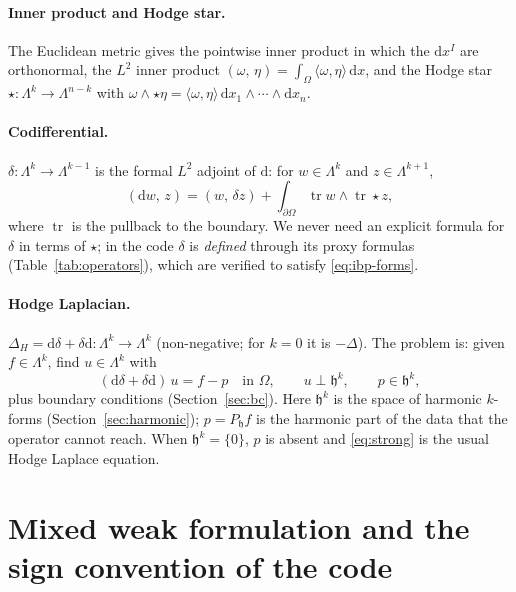 \documentclass[11pt]{article}
\newcommand{\dd}{\mathrm{d}}
\newcommand{\cod}{\delta}
\newcommand{\tr}{\operatorname{tr}}
\newcommand{\hodge}{\star}
\newcommand{\Hspace}{\mathfrak{h}}
\newcommand{\ip}[2]{\left(#1,\,#2\right)}
\theoremstyle{remark}
\begin{document}
\paragraph{Inner product and Hodge star.} The Euclidean metric gives the pointwise inner product
in which the $\dd x^I$ are orthonormal, the $L^2$ inner product $\ip{\omega}{\eta} =
\int_\Omega \langle\omega,\eta\rangle\,\dd x$, and the Hodge star $\hodge:\Lambda^k\to\Lambda^{n-k}$
with $\omega\wedge\hodge\eta = \langle\omega,\eta\rangle\,\dd x_1\wedge\cdots\wedge\dd x_n$.

\paragraph{Codifferential.} $\cod:\Lambda^{k}\to\Lambda^{k-1}$ is the formal $L^2$ adjoint of
$\dd$: for $w\in\Lambda^{k}$ and $z\in\Lambda^{k+1}$,
\begin{equation}\label{eq:ibp-forms}
  \ip{\dd w}{z} = \ip{w}{\cod z} + \int_{\partial\Omega} \tr w \wedge \tr \hodge z ,
\end{equation}
where $\tr$ is the pullback to the boundary. We never need an explicit formula for $\cod$ in
terms of $\hodge$; in the code $\cod$ is \emph{defined} through its proxy formulas
(Table~\ref{tab:operators}), which are verified to satisfy \eqref{eq:ibp-forms}.

\paragraph{Hodge Laplacian.} $\Delta_H = \dd\cod + \cod\dd : \Lambda^k\to\Lambda^k$
(non-negative; for $k=0$ it is $-\Delta$). The problem is: given $f\in\Lambda^k$, find
$u\in\Lambda^k$ with
\begin{equation}\label{eq:strong}
  (\dd\cod + \cod\dd)\,u = f - p \quad\text{in }\Omega, \qquad u\perp\Hspace^k, \qquad p\in\Hspace^k,
\end{equation}
plus boundary conditions (Section~\ref{sec:bc}). Here $\Hspace^k$ is the space of harmonic
$k$-forms (Section~\ref{sec:harmonic}); $p=P_{\Hspace}f$ is the harmonic part of the data that
the operator cannot reach. When $\Hspace^k=\{0\}$, $p$ is absent and \eqref{eq:strong} is the
usual Hodge Laplace equation.

\section{Mixed weak formulation and the sign convention of the code}\label{sec:weak}
\end{document}
